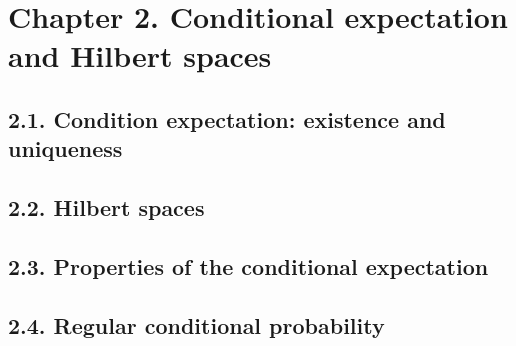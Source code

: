 \section*{Chapter 2. Conditional expectation and Hilbert spaces}
\subsection*{2.1. Condition expectation: existence and uniqueness}
\subsection*{2.2. Hilbert spaces}
\subsection*{2.3. Properties of the conditional expectation}
\subsection*{2.4. Regular conditional probability}

